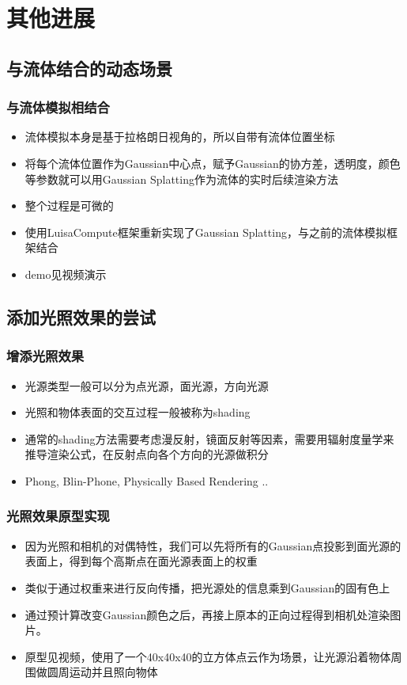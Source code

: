 \documentclass{njupre/njupre}
\begin{document}
\section{其他进展}
\subsection{与流体结合的动态场景}
\begin{frame}
\frametitle{与流体模拟相结合}
\begin{itemize}
    \item 流体模拟本身是基于拉格朗日视角的，所以自带有流体位置坐标
    \item 将每个流体位置作为Gaussian中心点，赋予Gaussian的协方差，透明度，颜色等参数就可以用Gaussian Splatting作为流体的实时后续渲染方法
    \item 整个过程是可微的
    \item 使用LuisaCompute框架重新实现了Gaussian Splatting，与之前的流体模拟框架结合
    \item demo见视频演示
\end{itemize}
\end{frame}

\subsection{添加光照效果的尝试}
\begin{frame}
\frametitle{增添光照效果}
\begin{itemize}
    \item 光源类型一般可以分为点光源，面光源，方向光源
    \item 光照和物体表面的交互过程一般被称为shading 
    \item 通常的shading方法需要考虑漫反射，镜面反射等因素，需要用辐射度量学来推导渲染公式，在反射点向各个方向的光源做积分
    \item Phong, Blin-Phone, Physically Based Rendering ..
\end{itemize}
\end{frame}

\begin{frame}
\frametitle{光照效果原型实现}
\begin{itemize}
    \item 因为光照和相机的对偶特性，我们可以先将所有的Gaussian点投影到面光源的表面上，得到每个高斯点在面光源表面上的权重
    \item 类似于通过权重来进行反向传播，把光源处的信息乘到Gaussian的固有色上
    \item 通过预计算改变Gaussian颜色之后，再接上原本的正向过程得到相机处渲染图片。
    \item 原型见视频，使用了一个40x40x40的立方体点云作为场景，让光源沿着物体周围做圆周运动并且照向物体
\end{itemize}
\end{frame}
\end{document}
